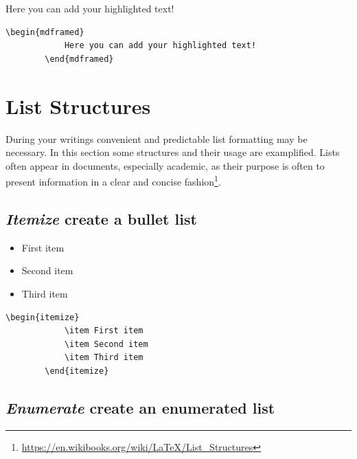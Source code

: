 \begin{mdframed}
	Here you can add your highlighted text! 	
\end{mdframed}

\begin{mdframed}
	\begin{lstlisting}[language = Tex, caption={Example for the highlighted blue box}]
		\begin{mdframed}
			Here you can add your highlighted text! 	
		\end{mdframed}
	\end{lstlisting}
\end{mdframed}

\section{List Structures}
During your writings convenient and predictable list formatting may be necessary. In this section some structures and their usage are examplified. Lists often appear in documents, especially academic, as their purpose is often to present information in a clear and concise fashion\footnote{\url{https://en.wikibooks.org/wiki/LaTeX/List_Structures}}.

\subsection{\emph{Itemize} create a bullet list}

\begin{itemize}
	\item First item
	\item Second item
	\item Third item
\end{itemize}

\begin{mdframed}
	\begin{lstlisting}[language = Tex, caption={Example of an itemized structure}]
		\begin{itemize}
			\item First item
			\item Second item
			\item Third item
		\end{itemize}
	\end{lstlisting}
\end{mdframed}

\subsection{\emph{Enumerate} create an enumerated list}

